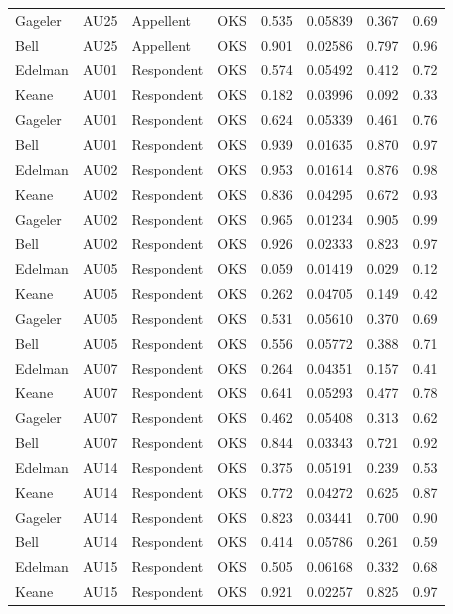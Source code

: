\documentclass{monashthesis}
\begin{document}
\begin{center}
\begin{longtable}{llllllll}
Gageler & AU25 & Appellent & OKS & 0.535 & 0.05839 & 0.367 & 0.69 \\
Bell & AU25 & Appellent & OKS & 0.901 & 0.02586 & 0.797 & 0.96 \\
Edelman & AU01 & Respondent & OKS & 0.574 & 0.05492 & 0.412 & 0.72 \\
Keane & AU01 & Respondent & OKS & 0.182 & 0.03996 & 0.092 & 0.33 \\
Gageler & AU01 & Respondent & OKS & 0.624 & 0.05339 & 0.461 & 0.76 \\
Bell & AU01 & Respondent & OKS & 0.939 & 0.01635 & 0.870 & 0.97 \\
Edelman & AU02 & Respondent & OKS & 0.953 & 0.01614 & 0.876 & 0.98 \\
Keane & AU02 & Respondent & OKS & 0.836 & 0.04295 & 0.672 & 0.93 \\
Gageler & AU02 & Respondent & OKS & 0.965 & 0.01234 & 0.905 & 0.99 \\
Bell & AU02 & Respondent & OKS & 0.926 & 0.02333 & 0.823 & 0.97 \\
Edelman & AU05 & Respondent & OKS & 0.059 & 0.01419 & 0.029 & 0.12 \\
Keane & AU05 & Respondent & OKS & 0.262 & 0.04705 & 0.149 & 0.42 \\
Gageler & AU05 & Respondent & OKS & 0.531 & 0.05610 & 0.370 & 0.69 \\
Bell & AU05 & Respondent & OKS & 0.556 & 0.05772 & 0.388 & 0.71 \\
Edelman & AU07 & Respondent & OKS & 0.264 & 0.04351 & 0.157 & 0.41 \\
Keane & AU07 & Respondent & OKS & 0.641 & 0.05293 & 0.477 & 0.78 \\
Gageler & AU07 & Respondent & OKS & 0.462 & 0.05408 & 0.313 & 0.62 \\
Bell & AU07 & Respondent & OKS & 0.844 & 0.03343 & 0.721 & 0.92 \\
Edelman & AU14 & Respondent & OKS & 0.375 & 0.05191 & 0.239 & 0.53 \\
Keane & AU14 & Respondent & OKS & 0.772 & 0.04272 & 0.625 & 0.87 \\
Gageler & AU14 & Respondent & OKS & 0.823 & 0.03441 & 0.700 & 0.90 \\
Bell & AU14 & Respondent & OKS & 0.414 & 0.05786 & 0.261 & 0.59 \\
Edelman & AU15 & Respondent & OKS & 0.505 & 0.06168 & 0.332 & 0.68 \\
Keane & AU15 & Respondent & OKS & 0.921 & 0.02257 & 0.825 & 0.97 \\

\end{longtable}
\end{center}
\end{document}
